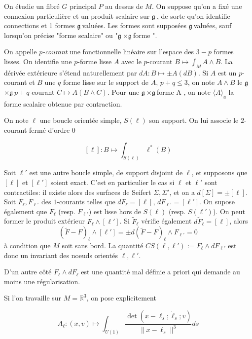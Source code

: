 \documentclass[10pt]{article}
\newcommand\g{$\mathfrak{g}\ $}
\begin{document}
On étudie un fibré $G$ principal $P$ au dessus de $M$. On suppose qu'on a fixé une connexion particulière et un produit scalaire sur \g, de sorte qu'on identifie connections et 1 formes \g valuées. Les formes sont supposées \g valuées, sauf lorsqu'on précise "forme scalaire" ou "\g$ \times $\g forme ".

On appelle \textit{$p$-courant} une fonctionnelle linéaire sur l'espace des $3-p$ formes lisses. On identifie une $p$-forme lisse $A$ avec le $p$-courant $B\mapsto \int_M A\wedge B$. La dérivée extérieure s'étend naturellement par $dA:B\mapsto \pm A(dB)$. Si $A$ est un $p$-courant et $B$ une $q$ forme lisse sur le support de $A$, $p+q\leq 3$, on note $A\wedge B$ le \g$ \times $\g  $p+q$-courant
$C\mapsto A(B\wedge C)$. Pour une \g$ \times $\g forme A , on note $\langle A\rangle_\mathfrak{g}$ la forme scalaire obtenue par contraction.


On note $\ell$ une boucle orientée simple, $S(\ell)$ son support. On lui associe le $2$-courant fermé d'ordre $0$

\[[\ell]: B\mapsto \int_{S(\ell)} \ell^*(B) \]

Soit $\ell'$ est une autre boucle simple, de support disjoint de $\ell$, et supposons que $[\ell]$ et $[\ell']$ soient exact. C'est en particulier le cas si $\ell$ et $\ell'$ sont contractiles: il existe alors des surfaces de Seifert $\Sigma, \Sigma'$, et on a $d[\Sigma]=\pm [\ell]$. Soit $F_\ell, F_{\ell'}$  des $1$-courants telles que $dF_\ell=[\ell]$, $dF_{\ell'}=[\ell']$. On supose également que $F_{\ell}$ (resp. $F_{\ell'}$) est lisse hors de $S(\ell)$ (resp. $S(\ell')$). On peut former le produit extérieur $F_\ell\wedge [\ell']$. Si $\tilde{F}_\ell$ vérifie également $d\tilde{F}_\ell=[\ell]$, alors \[
  (\tilde{F}-F)_\ell\wedge [\ell']=\pm d(\tilde{F}-F)_\ell\wedge F_{\ell'}=0\]
à condition que $M$ soit sans bord. La quantité $CS(\ell,\ell'):=F_\ell\wedge dF_{\ell'}$ est donc un invariant des noeuds orientés $\ell,\ell'$.

D'un autre côté $F_\ell\wedge dF_\ell$ est une quantité mal définie a priori qui demande au moins une régularisation.

Si l'on travaille sur $M=\mathbb{R}^3$, on pose explicitement

\[A_\ell:(x,v)\mapsto \int_{U(1)} \frac{\det(x-\ell_s;\dot{\ell}_s;v)}{\|x-\ell_s\|^3} ds \]
\end{document}

